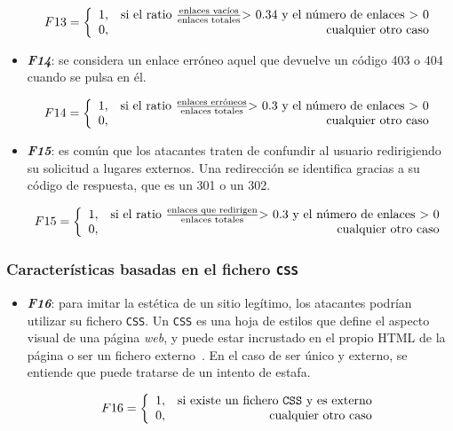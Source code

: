 \begin{itemize}
	\[F13 = \left\{ \begin{array}{lr} 1, & \text{si el ratio } \frac{\text{enlaces vacíos}}{\text{enlaces totales}} \text{> 0.34 y el número de enlaces > 0} \\
		0, & \text{\raggedright cualquier otro caso} \label{eqn:phishing_f13} \end{array}\right.\]
	
	\item \textit{\textbf{F14}}: se considera un enlace erróneo aquel que devuelve un código 403 o 404 cuando se pulsa en él.
	
	\[F14 = \left\{ \begin{array}{lr} 1, & \text{si el ratio } \frac{\text{enlaces erróneos}}{\text{enlaces totales}} \text{> 0.3 y el número de enlaces > 0} \\
		0, & \text{\raggedright cualquier otro caso} \label{eqn:phishing_f14} \end{array}\right.\]
	
	\item \textit{\textbf{F15}}: es común que los atacantes traten de confundir al usuario redirigiendo su solicitud a lugares externos. Una redirección se identifica gracias a su código de respuesta, que es un 301 o un 302.
	
	\[F15 = \left\{ \begin{array}{lr} 1, & \text{si el ratio } \frac{\text{enlaces que redirigen}}{\text{enlaces totales}} \text{> 0.3 y el número de enlaces > 0} \\
		0, & \text{\raggedright cualquier otro caso} \label{eqn:phishing_f15} \end{array}\right.\]
\end{itemize}


\subsubsection{Características basadas en el fichero \texttt{CSS}}

\begin{itemize}
	\item \textit{\textbf{F16}}: para imitar la estética de un sitio legítimo, los atacantes podrían utilizar su fichero \texttt{CSS}. Un \texttt{CSS} es una hoja de estilos que define el aspecto visual de una página \textit{web}, y puede estar incrustado en el propio HTML de la página o ser un fichero externo~\cite{cssExternos}. En el caso de ser único y externo, se entiende que puede tratarse de un intento de estafa.
	
	\[F16 = \left\{ \begin{array}{lr} 1, & \text{si existe un fichero \texttt{CSS} y es externo}\\
		0, & \text{\raggedright cualquier otro caso} \label{eqn:phishing_f16} \end{array}\right.\]
\end{itemize}


